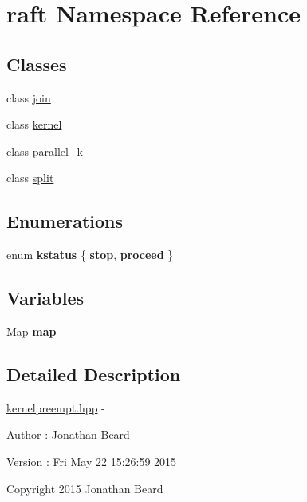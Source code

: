 \hypertarget{namespaceraft}{}\section{raft Namespace Reference}
\label{namespaceraft}
\subsection*{Classes}
\begin{DoxyCompactItemize}
\item 
class \hyperlink{classraft_1_1join}{join}
\item 
class \hyperlink{classraft_1_1kernel}{kernel}
\item 
class \hyperlink{classraft_1_1parallel__k}{parallel\+\_\+k}
\item 
class \hyperlink{classraft_1_1split}{split}
\end{DoxyCompactItemize}
\subsection*{Enumerations}
\begin{DoxyCompactItemize}
\item 
\hypertarget{namespaceraft_a0d60fc92faf93d85edd021f6b32b9a38}{}enum {\bfseries kstatus} \{ {\bfseries stop}, 
{\bfseries proceed}
 \}\label{namespaceraft_a0d60fc92faf93d85edd021f6b32b9a38}

\end{DoxyCompactItemize}
\subsection*{Variables}
\begin{DoxyCompactItemize}
\item 
\hypertarget{namespaceraft_a088a11ee950c972d705c2d61e688daa3}{}\hyperlink{class_map}{Map} {\bfseries map}\label{namespaceraft_a088a11ee950c972d705c2d61e688daa3}

\end{DoxyCompactItemize}


\subsection{Detailed Description}
\hyperlink{kernelpreempt_8hpp_source}{kernelpreempt.\+hpp} -\/ \begin{DoxyAuthor}{Author}
\+: Jonathan Beard 
\end{DoxyAuthor}
\begin{DoxyVersion}{Version}
\+: Fri May 22 15\+:26\+:59 2015
\end{DoxyVersion}
Copyright 2015 Jonathan Beard

